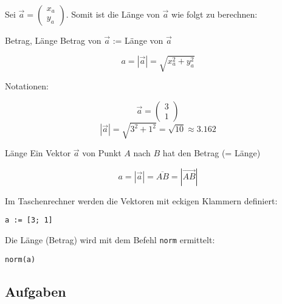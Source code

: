 Sei $\vec{a}  = \begin{pmatrix}x_a\\y_a\end{pmatrix}$. Somit ist die Länge von
    $\vec{a}$ wie folgt zu berechnen:

    \begin{gesetz}{Betrag, Länge}{}
      Betrag von $\vec{a}$ := Länge von $\vec{a}$

      $$a = |\vec{a}| = \sqrt{x_a^2 + y_a^2}$$
      \end{gesetz}
    Notationen:

    \begin{beispiel}{}{}
      $$ \vec{a}= \begin{pmatrix} 3\\ 1\end{pmatrix}$$
        $$|\vec{a}| = \sqrt{3^2+1^2} = \sqrt{10}\approx 3.162$$
      \end{beispiel}
    
    \begin{definition}{Länge}{}
      Ein Vektor $\vec{a}$ von Punkt $A$ nach $B$ hat den Betrag (= Länge)

      $$a = |\vec{a}| = \overline{AB} = \left|\overrightarrow{AB}\right|$$
    \end{definition}

    \begin{bemerkung}{}{}
      Im Taschenrechner werden die Vektoren mit eckigen Klammern
      definiert:

      \texttt{a := [3; 1]}

      Die Länge (Betrag) wird mit dem Befehl \texttt{norm} ermittelt:

      \texttt{norm(a)}
    \end{bemerkung}
        
\subsection*{Aufgaben}    
\newpage
